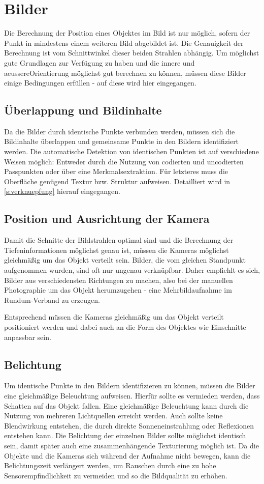 \documentclass[./00PhotoBox.tex]{subfiles}
\begin{document}
\section{Bilder}
\label{s:bilder}

Die Berechnung der Position eines Objektes im Bild ist nur möglich, sofern der Punkt in mindestens einem weiteren Bild abgebildet ist. Die Genauigkeit der Berechnung ist vom Schnittwinkel dieser beiden Strahlen abhängig. Um möglichst gute Grundlagen zur Ver\-fügung zu haben und die innere und \gls{aeussereOrientierung} möglichst gut berechnen zu können, müssen diese Bilder einige Bedingungen erfüllen - auf diese wird hier eingegangen.

\subsection{Überlappung und Bildinhalte}
Da die Bilder durch identische Punkte verbunden werden, müssen sich die Bildinhalte überlappen und gemeinsame Punkte in den Bildern identifiziert werden. Die automatische Detektion von identischen Punkten ist auf verschiedene Weisen möglich: Entweder durch die Nutzung von codierten und uncodierten Passpunkten oder über eine Merkmalsextraktion. Für letzteres muss die Oberfläche genügend Textur bzw. Struktur aufweisen. Detailliert wird in \autoref{s:verknuepfung} hierauf eingegangen. \citep[S. 478]{luhmann}

\subsection{Position und Ausrichtung der Kamera}
Damit die Schnitte der Bildstrahlen optimal sind und die Berechnung der Tiefeninformationen möglichst genau ist, müssen die Kameras möglichst gleichmäßig um das Objekt verteilt sein.
Bilder, die vom gleichen Standpunkt aufgenommen wurden, sind oft nur ungenau verknüpfbar. Daher empfiehlt es sich, Bilder aus verschiedensten Richtungen zu machen, also bei der manuellen Photographie um das Objekt herumzugehen - eine Mehrbildaufnahme im Rundum-Verband zu erzeugen. \citep[S. 170]{luhmann}

Entsprechend müssen die Kameras gleichmäßig um das Objekt verteilt positioniert werden und dabei auch an die Form des Objektes wie Einschnitte anpassbar sein.

\subsection{Belichtung}
Um identische Punkte in den Bildern identifizieren zu können, müssen die Bilder eine gleichmäßige Beleuchtung aufweisen. Hierfür sollte es vermieden werden, dass Schatten auf das Objekt fallen. Eine gleichmäßige Beleuchtung kann durch die Nutzung von mehreren Lichtquellen erreicht werden. Auch sollte keine Blendwirkung entstehen, die durch direkte Sonneneinstrahlung oder Reflexionen entstehen kann. Die Belichtung der einzelnen Bilder sollte möglichst identisch sein, damit später auch eine zusammenhängende Texturierung möglich ist.
Da die Objekte und die Kameras sich während der Aufnahme nicht bewegen, kann die Belichtungszeit verlängert werden, um Rauschen durch eine zu hohe Sensorempfindlichkeit zu vermeiden und so die Bildqualität zu erhöhen.
\end{document}
